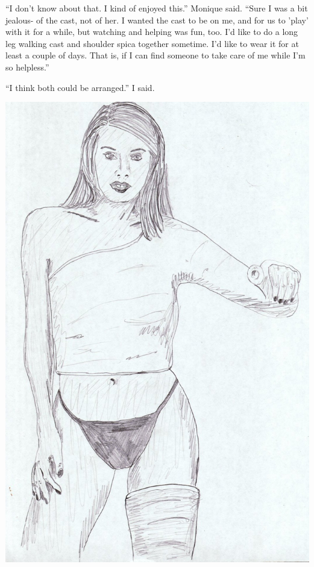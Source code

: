 ``I don't know about that. I kind of enjoyed this.'' Monique said. ``Sure I was a bit jealous-
of the cast, not of her. I wanted the cast to be on me, and for us to 'play' with it for a
while, but watching and helping was fun, too. I'd like to do a long leg walking cast and
shoulder spica together sometime. I'd like to wear it for at least a couple of days. That is, if
I can find someone to take care of me while I'm so helpless.''

``I think both could be arranged.'' I said.

\begin{center}
\includegraphics{images/kicks33.jpg}
\end{center}
